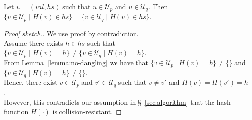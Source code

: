 \documentclass[a4paper,anonymous,USenglish]{lipics-v2019}
\begin{document}
\begin{lemma}\label{lemma:no-collision}
Let $u = (\mathit{val}, \mathit{hs})$ such that $u \in \mathcal{U}_p$ and $u \in \mathcal{U}_q$.
Then $\{v \in \mathcal{U}_p \mid H(v) \in \mathit{hs}\} = \{v \in \mathcal{U}_q \mid H(v) \in \mathit{hs}\}$.
\end{lemma}
\begin{proof}[Proof sketch.]
We use proof by contradiction.\\
Assume there exists $h \in \mathit{hs}$ such that $\{v \in \mathcal{U}_p \mid H(v) = h\} \neq \{v \in \mathcal{U}_q \mid H(v) = h\}$.\\
From Lemma~\ref{lemma:no-dangling} we have that $\{v \in \mathcal{U}_p \mid H(v) = h\} \neq \{\}$ and $\{v \in \mathcal{U}_q \mid H(v) = h\} \neq \{\}$.\\
Hence, there exist $v \in \mathcal{U}_p$ and $v' \in \mathcal{U}_q$ such that $v \neq v'$ and $H(v) = H(v') = h$.\\
However, this contradicts our assumption in \S~\ref{sec:algorithm} that the hash function $H(\cdot)$ is collision-resistant.
\end{proof}
\end{document}
